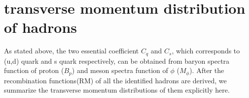 \documentclass[twocolumn,aps,superscriptaddress,showpacs,nofootinbib,floatfix]{revtex4}
\def\pt{p_T}
\begin{document}
%
%
%
%



\section{transverse momentum distribution of hadrons}\label{DOH4}
As stated above, the two essential coefficient $C_q$ and $C_s$, which corresponds to (u,d) quark and s quark respectively, can be obtained from baryon spectra function of proton ($B_p$) and meson spectra function of $\phi$ ($M_{\phi}$). After the recombination functions(RM) of all the identified hadrons are derived, we summarize the transverse momentum distributions of them explicitly here.
\end{document}
